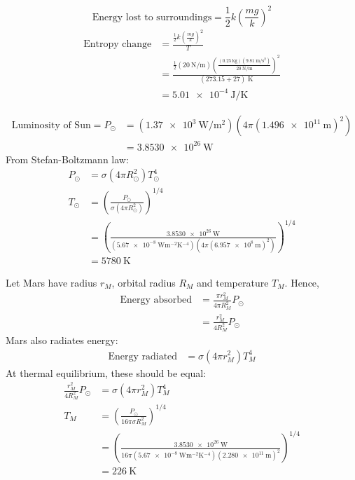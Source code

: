 \begin{solution}
\begin{subsolution}
        \[\text{Energy lost to surroundings}=\frac{1}{2}k\left(\frac{mg}{k}\right)^2\]
        \begin{align*}
            \text{Entropy change}&=\frac{\frac{1}{2}k\left(\frac{mg}{k}\right)^2}{T}\\
            &=\frac{\frac{1}{2}(\qty{20}{\N\per\m})\left(\frac{(\qty{0.25}{\kg})(\qty{9.81}{\m\per\square\s})}{\qty{20}{\N\per\m}}\right)^2}{(273.15+27)\;\unit{\K}}\\
            &=\boxed{\qty{5.01e-4}{\J\per\K}}
        \end{align*}
    \end{subsolution}
    \tcblower
    \begin{subsolution}
        \begin{align*}
            \text{Luminosity of Sun}=P_{\odot}&=(\qty{1.37e3}{\W\per\square\m})(4\pi(\qty{1.496e11}{\m})^2)\\
            &=\qty{3.8530e26}{\W}
        \end{align*}
        From Stefan-Boltzmann law:
        \begin{align*}
            P_{\odot}&=\sigma(4\pi R_{\odot}^2)T_{\odot}^4\\
            T_{\odot}&=\left(\frac{P_{\odot}}{\sigma(4\pi R_{\odot}^2)}\right)^{1/4}\\
            &=\left(\frac{\qty{3.8530e26}{\W}}{(\qty{5.67e-8}{\W\m^{-2}\K^{-4}})(4\pi(\qty{6.957e8}{\m})^2)}\right)^{1/4}\\
            &=\boxed{\qty{5780}{\K}}
        \end{align*}
    \end{subsolution}
    \tcblower
    \begin{subsolution}
        Let Mars have radius $r_M$, orbital radius $R_M$ and temperature $T_M$. Hence,
        \begin{align*}
            \text{Energy absorbed}&=\frac{\pi r_M^2}{4\pi R_M^2}P_{\odot}\\
            &=\frac{r_M^2}{4 R_M^2}P_{\odot}
        \end{align*}
        Mars also radiates energy:
        \begin{align*}
            \text{Energy radiated}&=\sigma(4\pi r_M^2)T_M^4
        \end{align*}
        At thermal equilibrium, these should be equal:
        \begin{align*}
            \frac{r_M^2}{4 R_M^2}P_{\odot}&=\sigma(4\pi r_M^2)T_M^4\\
            T_M&=\left(\frac{P_{\odot}}{16\pi\sigma R_M^2}\right)^{1/4}\\
            &=\left(\frac{\qty{3.8530e26}{\W}}{16\pi(\qty{5.67e-8}{\W\m^{-2}\K^{-4}})(\qty{2.280e11}{\m})^2}\right)^{1/4}\\
            &=\boxed{\qty{226}{\K}}
        \end{align*}
    \end{subsolution}
\end{solution}

